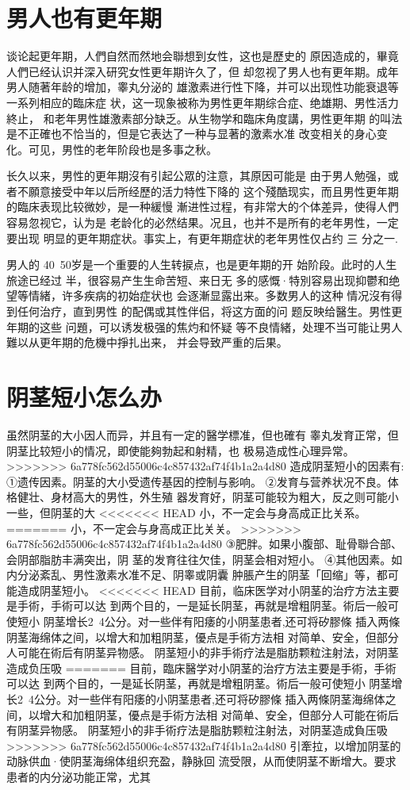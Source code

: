 \documentclass[12pt,UTF8]{ctexbook}
\begin{document}
\section{男人也有更年期}

谈论起更年期，人們自然而然地会聯想到女性，这也是歷史的
原因造成的，畢竟人們已经认识并深入研究女性更年期许久了，但
却忽视了男人也有更年期。成年男人随著年龄的增加，睾丸分泌的
雄激素进行性下降，并可以出现性功能衰退等一系列相应的臨床症
状，这一现象被称为男性更年期综合症、绝雄期、男性活力終止，
和老年男性雄激素部分缺乏。从生物学和臨床角度講，男性更年期
的叫法是不正確也不恰当的，但是它表达了一种与显著的激素水准
改变相关的身心变化。可见，男性的老年阶段也是多事之秋。

长久以来，男性的更年期沒有引起公眾的注意，其原因可能是
由于男人勉强，或者不願意接受中年以后所经歷的活力特性下降的
这个殘酷现实，而且男性更年期的臨床表现比较微妙，是一种緩慢
漸进性过程，有非常大的个体差异，使得人們容易忽视它，认为是
老龄化的必然结果。况且，也并不是所有的老年男性，一定要出现
明显的更年期症状。事实上，有更年期症状的老年男性仅占约 三
分之一.

男人的 40~50岁是一个重要的人生转捩点，也是更年期的开
始阶段。此时的人生旅途已经过
半，很容易产生生命苦短、来日无
多的感慨·特別容易出现抑鬱和绝
望等情緒，许多疾病的初始症状也
会逐漸显露出来。多数男人的这种
情况沒有得到任何治疗，直到男性
的配偶或其性伴侣，将这方面的问
题反映给醫生。男性更年期的这些
问題，可以诱发极强的焦灼和怀疑
等不良情緒，处理不当可能让男人
難以从更年期的危機中掙扎出来，
并会导致严重的后果。

\section{阴茎短小怎么办}

虽然阴茎的大小因人而异，并且有一定的醫学標准，但也確有
睾丸发育正常，但阴茎比较短小的情况，即使能夠勃起和射精，也
极易造成性心理异常。
>>>>>>> 6a778fc562d55006c4c857432af74f4b1a2a4d80
造成阴茎短小的因素有:
①遗传因素。阴茎的大小受遗传基因的控制与影响。
②发育与营养状况不良。体格健壮、身材高大的男性，外生殖
器发育好，阴茎可能较为粗大，反之则可能小一些，但阴茎的大
<<<<<<< HEAD
小，不一定会与身高成正比关系。
=======
小，不一定会与身高成正比关关。
>>>>>>> 6a778fc562d55006c4c857432af74f4b1a2a4d80
③肥胖。如果小腹部、耻骨聯合部、会阴部脂肪丰满突出，阴
茎的发育往往欠佳，阴茎会相对短小。
④其他因素。如内分泌紊乱、男性激素水准不足、阴睾或阴囊
肿脹产生的阴茎「回缩」等，都可能造成阴茎短小。
<<<<<<< HEAD
目前，临床医学对小阴茎的治疗方法主要是手術，手術可以达
到两个目的，一是延长阴茎，再就是增粗阴茎。術后一般可使短小
阴茎增长2~4公分。对一些伴有阳痿的小阴茎患者,还可将矽膠條
插入两條阴茎海绵体之间，以增大和加粗阴茎，優点是手術方法相
对简单、安全，但部分人可能在術后有阴茎异物感。
阴茎短小的非手術疗法是脂肪颗粒注射法，对阴茎造成负压吸
=======
目前，臨床醫学对小阴茎的治疗方法主要是手術，手術可以达
到两个目的，一是延长阴茎，再就是增粗阴茎。術后一般可使短小
阴茎增长2~4公分。对一些伴有阳痿的小阴茎患者,还可将矽膠條
插入两條阴茎海绵体之间，以增大和加粗阴茎，優点是手術方法相
对简单、安全，但部分人可能在術后有阴茎异物感。
阴茎短小的非手術疗法是脂肪颗粒注射法，对阴茎造成負压吸
>>>>>>> 6a778fc562d55006c4c857432af74f4b1a2a4d80
引牽拉，以增加阴茎的动脉供血·使阴茎海绵体组织充盈，静脉回
流受限，从而使阴茎不断增大。要求患者的内分泌功能正常，尤其
\end{document}

